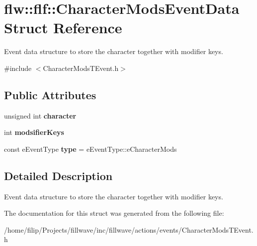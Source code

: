 \hypertarget{structflw_1_1flf_1_1CharacterModsEventData}{}\section{flw\+:\+:flf\+:\+:Character\+Mods\+Event\+Data Struct Reference}
\label{structflw_1_1flf_1_1CharacterModsEventData}


Event data structure to store the character together with modifier keys.  




{\ttfamily \#include $<$Character\+Mods\+T\+Event.\+h$>$}

\subsection*{Public Attributes}
\begin{DoxyCompactItemize}
\item 
unsigned int {\bfseries character}\hypertarget{structflw_1_1flf_1_1CharacterModsEventData_a4796fb81b9ac68e43b4d2bf2385f1470}{}\label{structflw_1_1flf_1_1CharacterModsEventData_a4796fb81b9ac68e43b4d2bf2385f1470}

\item 
int {\bfseries modsifier\+Keys}\hypertarget{structflw_1_1flf_1_1CharacterModsEventData_ab1383f98fa3c6243e4e12ea804b67c38}{}\label{structflw_1_1flf_1_1CharacterModsEventData_ab1383f98fa3c6243e4e12ea804b67c38}

\item 
const e\+Event\+Type {\bfseries type} = e\+Event\+Type\+::e\+Character\+Mods\hypertarget{structflw_1_1flf_1_1CharacterModsEventData_a2494e4b85d6da62484bedacd652ed6dd}{}\label{structflw_1_1flf_1_1CharacterModsEventData_a2494e4b85d6da62484bedacd652ed6dd}

\end{DoxyCompactItemize}


\subsection{Detailed Description}
Event data structure to store the character together with modifier keys. 

The documentation for this struct was generated from the following file\+:\begin{DoxyCompactItemize}
\item 
/home/filip/\+Projects/fillwave/inc/fillwave/actions/events/Character\+Mods\+T\+Event.\+h\end{DoxyCompactItemize}
